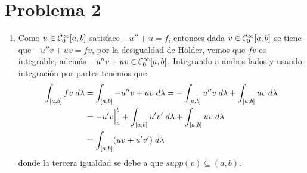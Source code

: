 \documentclass{article}
\begin{document}
\section*{Problema 2}
\begin{enumerate}
    \item Como $u\in\mathcal{C}_{0}^{\infty}[a,b]$ satisface $-u''+u=f$, entonces dada $v\in
    \mathcal{C}_{0}^{\infty}[a,b]$ se tiene que $-u''v+uv=fv$, por la desigualdad de Hölder, vemos que 
    $fv$ es integrable, además $-u''v+uv\in\mathcal{C}_{0}^{\infty}[a,b]$. Integrando a ambos lados y
    usando integración por partes tenemos que
    \begin{align*}
        \int_{[a,b]}fv\hspace{1mm}d\lambda &= \int_{[a,b]}-u''v+uv\hspace{1mm}d\lambda
        =-\int_{[a,b]}u''v\hspace{1mm}d\lambda+\int_{[a,b]}uv\hspace{1mm}d\lambda \\
        &= -u'v\Big|_{a}^{b}+\int_{[a,b]}u'v'\hspace{1mm}d\lambda
        +\int_{[a,b]}uv\hspace{1mm}d\lambda \\
        &= \int_{[a,b]}(uv+u'v')\hspace{1mm}d\lambda
    \end{align*}
    donde la tercera igualdad se debe a que $supp(v)\subseteq(a,b)$.


\end{enumerate}
\end{document}
